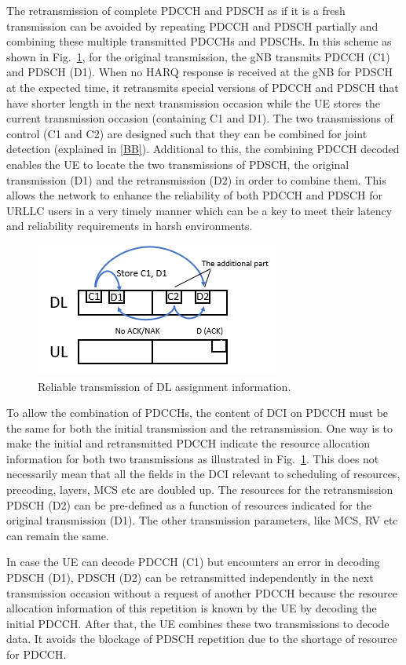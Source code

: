 \documentclass[conference]{IEEEtran}
\begin{document}
The retransmission of complete PDCCH and PDSCH as if it is a fresh transmission can be avoided by repeating PDCCH and PDSCH partially and combining these multiple transmitted PDCCHs and PDSCHs. In this scheme as shown in Fig.~\ref{fig1}, for the original transmission, the gNB transmits PDCCH (C1) and PDSCH (D1). When no HARQ response is received at the gNB for PDSCH at the expected time, it retransmits special versions of PDCCH and PDSCH that have shorter length in the next transmission occasion while the UE stores the current transmission occasion (containing C1 and D1). The two transmissions of control (C1 and C2) are designed such that they can be combined for joint detection (explained in \ref{BB}). Additional to this, the combining PDCCH decoded enables the UE to locate the two transmissions of PDSCH, the original transmission (D1) and the retransmission (D2) in order to combine them. This allows the network to enhance the reliability of both PDCCH and PDSCH for URLLC users in a very timely manner which can be a key to meet their latency and reliability requirements in harsh environments. 

\begin{figure}[htbp]
\centerline{\includegraphics[scale=0.7]{fig1.png}}
\caption{Reliable transmission of DL assignment information.}
\label{fig1}
\end{figure}

To allow the combination of PDCCHs, the content of DCI on PDCCH must be the same for both the initial transmission and the retransmission. One way is to make the initial and retransmitted PDCCH indicate the resource allocation information for both two transmissions as illustrated in Fig.~\ref{fig1}. This does not necessarily mean that all the fields in the DCI relevant to scheduling of resources, precoding, layers, MCS etc are doubled up. The resources for the retransmission PDSCH (D2) can be pre-defined as a function of resources indicated for the original transmission (D1). The other transmission parameters, like MCS, RV etc can remain the same.

In case the UE can decode PDCCH (C1) but encounters an error in decoding PDSCH (D1), PDSCH (D2) can be retransmitted independently in the next transmission occasion without a request of another PDCCH because the resource allocation information of this repetition is known by the UE by decoding the initial PDCCH. After that, the UE combines these two transmissions to decode data. It avoids the blockage of PDSCH repetition due to the shortage of resource for PDCCH. 
\end{document}
